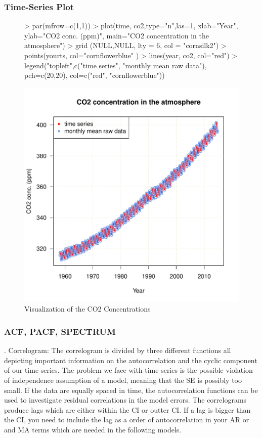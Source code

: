 \documentclass[11pt, a4paper]{article} %
\begin{document}
\subsubsection{Time-Series Plot}
\begin{figure}[H]
\centering
\begin{Schunk}
\begin{Sinput}
> par(mfrow=c(1,1))
> plot(time, co2,type="n",las=1, xlab="Year", ylab="CO2 conc. (ppm)",
         main="CO2 concentration in the atmosphere")
> grid (NULL,NULL, lty = 6, col = "cornsilk2")
> points(yourts, col="cornflowerblue" )
> lines(year, co2, col="red")
> legend("topleft",c("time series", "monthly mean raw data"),
 pch=c(20,20), col=c("red", "cornflowerblue"))
\end{Sinput}
\end{Schunk}
\includegraphics{alleselena-fig1visualize}
\caption{Visualization of the CO2 Concentrations}
\label{fig1visualize}
\end{figure}


\subsubsection{ACF, PACF, SPECTRUM}
. Correlogram:  The correlogram is divided by three different functions all depicting important information on the autocorrelation and the cyclic component of our time series.  The problem we face with time series is the possible violation of independence assumption of a model, meaning that the SE is possibly too small. If the data are equally spaced in time,  the autocorrelation functions can be used to investigate residual  correlations in the model errors. The correlograms produce lags which are either within the CI or outter CI. If a lag is bigger than the CI, you need to include the lag as a order of autocorrelation in your AR or\- and MA terms which are needed in the following models. 
\end{document}
